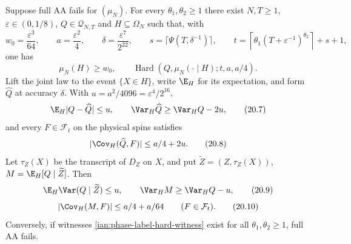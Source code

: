 \begin{theorem}
\label{ian:phase-label-hard-sector-converse}
Suppose full AA fails for \((\mu_N)\). For every \(\theta_1,\theta_2\ge1\)
there exist \(N,T\ge1\), \(\varepsilon\in(0,1/8)\),
\(Q\in\mathcal Q_{N,T}\) and \(H\subseteq\Omega_N\) such that, with
\[
 w_0=\frac{\varepsilon^3}{64},\qquad
 a=\frac{\varepsilon^2}{4},\qquad
 \delta=\frac{\varepsilon^7}{2^{22}},\qquad
 s=\lceil\Psi(T,\delta^{-1})\rceil,\qquad
 t=\left\lceil\theta_1(T+\varepsilon^{-1})^{\theta_2}\right\rceil+s+1,
 \tag{20.5}\label{ian:phase-label-explicit-parameters}
\]
one has
\[
 \mu_N(H)\ge w_0,\qquad
 \operatorname{Hard}(Q,\mu_N(\cdot\mid H);t,a,a/4).
 \tag{20.6}\label{ian:phase-label-hard-witness}
\]
Lift the joint law to the event \(\{X\in H\}\), write \(\E_H\) for its
expectation, and form \(\widehat Q\) at accuracy \(\delta\). With
\(u=a^2/4096=\varepsilon^4/2^{16}\),
\[
 \E_H|Q-\widehat Q|\le u,\qquad
 \Var_H\widehat Q\ge\Var_HQ-2u,
 \tag{20.7}\label{ian:phase-label-lifted-signal}
\]
and every \(F\in\mathcal F_t\) on the physical spins satisfies
\[
 |\Cov_H(\widehat Q,F)|\le a/4+2u.
 \tag{20.8}\label{ian:phase-label-lifted-covariance}
\]
Let \(\tau_Z(X)\) be the transcript of \(D_Z\) on \(X\), and put
\(\widetilde Z=(Z,\tau_Z(X))\), \(M=\E_H[Q\mid\widetilde Z]\). Then
\[
 \E_H\Var(Q\mid\widetilde Z)\le u,\qquad
 \Var_HM\ge\Var_HQ-u,
 \tag{20.9}\label{ian:phase-label-variance-explanation}
\]
\[
 |\Cov_H(M,F)|\le a/4+a/64
 \qquad(F\in\mathcal F_t).
 \tag{20.10}\label{ian:phase-label-explained-signal-hidden}
\]
Conversely, if witnesses \eqref{ian:phase-label-hard-witness} exist for
all \(\theta_1,\theta_2\ge1\), full AA fails.
\end{theorem}

